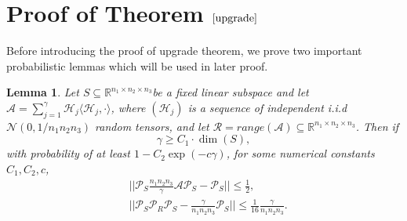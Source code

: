 \documentclass[journal,transmag]{IEEEtran}
\newtheorem{lemma}{Lemma}[section]
\theoremstyle{plain}
\begin{document}
\section{Proof of Theorem $\ref{upgrade}$}
Before introducing the proof of upgrade theorem, we prove two important probabilistic lemmas which will be used in later proof.
\begin{lemma} \label{prob1}
Let $S \subseteq \mathbb{R}^{n_1\times n_2\times n_3}$be a fixed linear subspace and let $\mathcal{A}=\sum_{j=1}^{\gamma}\mathcal{H}_j\langle\mathcal{H}_j,\cdot\rangle$, where $(\mathcal{H}_j)$ is a sequence of independent i.i.d $\mathcal{N}(0,1/n_1n_2n_3)$ random tensors, and let $\mathcal{R}=range(\mathcal{A})\subseteq \mathbb{R}^{n_1\times n_2\times n_3}$. Then if
\begin{equation}
\gamma \ge C_1\cdot \dim(S),
\end{equation}
with probability of at least $1-C_2 \exp(-c\gamma)$, for some numerical constants $C_1,C_2,c$,
\begin{equation}
\begin{split}
&||\mathcal{P}_S \frac{n_1 n_2 n_3}{\gamma}\mathcal{A} \mathcal{P}_S-\mathcal{P}_S||\le \frac{1}{2}, \\
&||\mathcal{P}_S \mathcal{P}_R \mathcal{P}_S-\frac{\gamma}{n_1 n_2 n_3}\mathcal{P}_S||\le \frac{1}{16} \frac{\gamma}{n_1 n_2 n_3}.
\end{split}
\end{equation}
\end{lemma}
\end{document}
